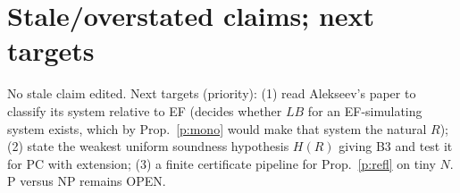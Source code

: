\documentclass[11pt]{article}
\theoremstyle{remark}
\begin{document}
\section{Stale/overstated claims; next targets}
No stale claim edited. Next targets (priority): (1) read Alekseev's paper to classify its system relative to EF (decides whether $LB$ for an EF-simulating system exists, which by Prop.~\ref{p:mono} would make that system the natural $R$); (2) state the weakest uniform soundness hypothesis $H(R)$ giving B3 and test it for PC with extension; (3) a finite certificate pipeline for Prop.~\ref{p:refl} on tiny $N$. P versus NP remains OPEN.
\end{document}
